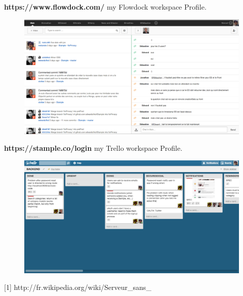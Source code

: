 \documentclass[11pt]{article} %
\begin{document}
\textbf{https://www.flowdock.com/} my Flowdock workspace Profile.
\begin{figure}[H]
        \centering
                \centering
                \includegraphics[width=\textwidth]{Flowdock.png}
               
\end{figure}
\newpage
\textbf{https://stample.co/login} my Trello workspace Profile.
\begin{figure}[H]
        \centering
                \centering
                \includegraphics[width=\textwidth]{trello.png}
               
\end{figure}
[1] http://fr.wikipedia.org/wiki/Serveur_sans_%
\end{document}
